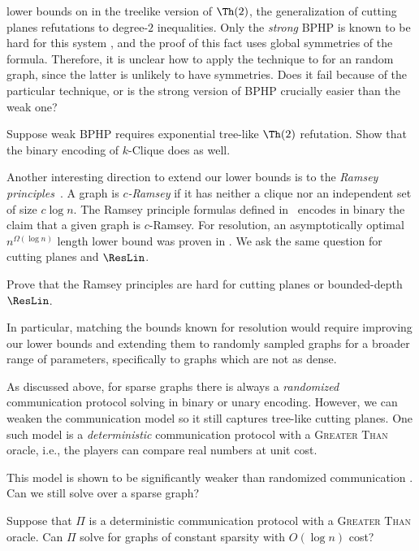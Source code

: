 lower
bounds on \kClique in the treelike version of $\Th(2)$, the generalization of cutting planes refutations to degree-$2$ inequalities. 
Only the \emph{strong} BPHP is known to be hard for this system \cite{IR21}, and the proof of this fact uses global symmetries of the formula. Therefore, it is unclear how to apply the technique to \kClique for an \erdosrenyi random graph, since the latter is unlikely to have symmetries. 
Does it fail because of the particular technique, or is the strong version of BPHP crucially easier than the weak one? 
\begin{problem}
    Suppose weak BPHP requires exponential tree-like $\Th(2)$ refutation. Show that the binary encoding of $k$-\textsf{Clique} does as well. 
\end{problem}
Another interesting direction to extend our lower bounds is to the \emph{Ramsey principles}~\cite{LPRT17ComplexityRamsey}.  
A graph is \emph{$c$-Ramsey} if it has neither a clique nor an independent set of size $c\log n$. 
The Ramsey principle formulas defined in~\cite{LPRT17ComplexityRamsey} encodes in binary
the claim that a given graph is $c$-Ramsey. For resolution, an asymptotically optimal $n^{\Omega (\log n)}$ length lower bound was proven in \cite{LPRT17ComplexityRamsey}.
We ask the same question for cutting planes and $\ResLin$.
\begin{problem}
    Prove that the Ramsey principles are hard for cutting planes or bounded-depth $\ResLin$.
\end{problem}
In particular, matching the bounds
known for resolution would require 
improving our lower bounds and 
extending them to randomly sampled graphs for a broader range of parameters,
specifically to graphs which are not as dense.

As discussed above, for sparse graphs there is always a \emph{randomized} communication protocol solving \kClique in binary or unary encoding. However, we can weaken the communication model so it still captures tree-like cutting planes. One such model is a \emph{deterministic} communication protocol with a \textsc{Greater Than} oracle, i.e., the players can compare real numbers at unit cost. 

This model is shown to be significantly weaker than randomized communication \cite{CLV19,CHHNPS25,GoosHR25}. Can we still solve \kClique over a sparse graph?
\begin{problem}
    Suppose that $\Pi$ is a deterministic communication protocol with a \textsc{Greater Than} oracle. Can $\Pi$ solve \kClique for \erdosrenyi graphs of constant sparsity with $O(\log n)$ cost?
\end{problem}

